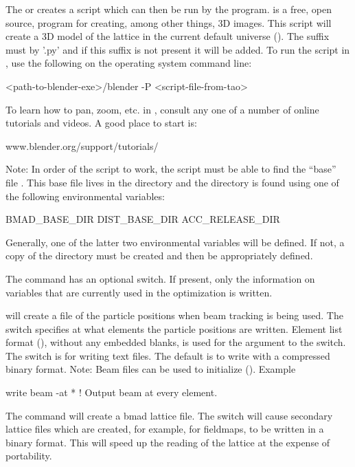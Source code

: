 {{{{{{The  or  creates a script which can then be run by
the  program\cite{b:blender}.   is a free, open source, program
for creating, among other things, 3D images. This script will create a 3D model of the
lattice in the current default universe (). The suffix must by '.py' and
if this suffix is not present it will be added. To run the script in , use the
following on the operating system command line:
\begin{example}
  <path-to-blender-exe>/blender -P <script-file-from-tao>
\end{example}
To learn how to pan, zoom, etc. in , consult any one of a number of online
tutorials and videos. A good place to start is:
\begin{example}
  www.blender.org/support/tutorials/  
\end{example}
Note: In order of the script to work, the script must be able to find the ``base'' file
. This base file lives in the  directory and the
 directory is found using one of the following environmental variables:
\begin{example}
  BMAD_BASE_DIR
  DIST_BASE_DIR
  ACC_RELEASE_DIR
\end{example}
Generally, one of the latter two environmental variables will be defined.  If not, a copy
of the \bmad directory must be created and then  be appropriately
defined.

The  command has an optional  switch.  If present,
only the information on variables that are currently used in the optimization is written.

 will create a file of the particle positions when beam tracking is being
used. The  switch specifies at what elements the particle positions are
written. Element list format (), without any embedded blanks, is
used for the  argument to the  switch. The  switch
is for writing text files. The default is to write with a compressed binary format.  Note:
Beam files can be used to initialize \tao (). Example
\begin{example}
  write beam -at *   ! Output beam at every element.
\end{example}

The  command will create a bmad lattice file. The  switch
will cause secondary lattice files which are created, for example, for fieldmaps, to
be written in a binary format. This will speed up the reading of the lattice at the
expense of portability.

}}}}}}

